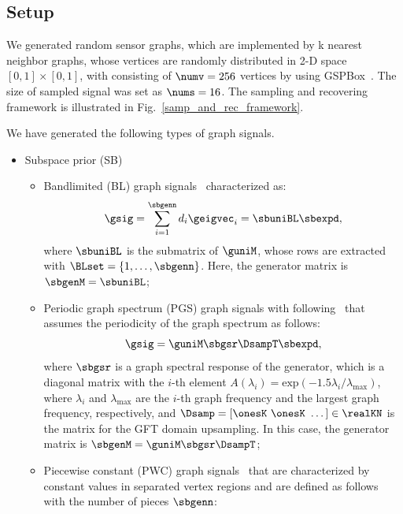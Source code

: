 \documentclass[journal]{IEEEtran}
\begin{document}
\subsection{Setup}
We generated random sensor graphs, which are implemented by k nearest neighbor graphs, whose vertices are randomly distributed in 2-D space $[0, 1] \times [0, 1]$, with consisting of $\numv = 256$ vertices by using GSPBox~\cite{perraudin2014gspbox}.
The size of sampled signal was set as $\nums = 16$.
The sampling and recovering framework is illustrated in Fig.~\ref{samp_and_rec_framework}.

We have generated the following types of graph signals.
\begin{itemize}[align=parleft, left=1.1mm, labelsep=1.1mm, itemindent=0mm]
    \item Subspace prior (SB)
    \begin{itemize}[align=parleft, left=0.5mm, labelsep=1.1mm, itemindent=0mm]
        \item Bandlimited (BL) graph signals~\cite{tanaka2020sampling} characterized as:
        \begin{equation} \label{BL}
            \gsig = \sum_{i=1}^{\sbgenn} d_i \geigvec_i = \sbuniBL \sbexpd,
        \end{equation}
        where $\sbuniBL$ is the submatrix of $\guniM$, whose rows are extracted with $\BLset = \{1,\dots,\sbgenn \}$.
        Here, the generator matrix is $\sbgenM = \sbuniBL$;
        \item Periodic graph spectrum (PGS) graph signals with following~\cite{tanaka2020gensamp} that assumes the periodicity of the graph spectrum as follows:
        \begin{equation} \label{PGS}
            \gsig = \guniM \sbgsr \DsampT \sbexpd,
        \end{equation}
        where $\sbgsr$ is a graph spectral response of the generator, which is a diagonal matrix with the $i$-th element $A(\lambda_{i}) = \mathrm{exp}(-1.5 \lambda_{i}/\lambda_{\mathrm{max}})$, where $\lambda_{i}$ and $\lambda_{\mathrm{max}}$ are the $i$-th graph frequency and the largest graph frequency, respectively, and $\Dsamp = [ \onesK \ \onesK \ \dots ] \in \realKN$ is the matrix for the GFT domain upsampling.
        In this case, the generator matrix is $\sbgenM = \guniM \sbgsr \DsampT$;
        \item Piecewise constant (PWC) graph signals~\cite{chen2016representations} that are characterized by constant values in separated vertex regions and are defined as follows with the number of pieces $\sbgenn$:

\end{itemize}
\end{itemize}
\end{document}
